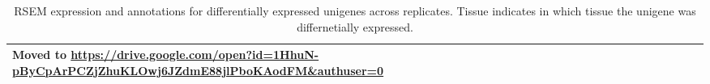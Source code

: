 \begin{table}[t]
\centering
\caption{RSEM expression and annotations for differentially expressed unigenes 
  across replicates. Tissue indicates in which tissue the unigene was differnetially expressed.}

\begin{tabular}{lll}
\toprule
    Moved to \scriptsize{\url{https://drive.google.com/open?id=1HhuN-pByCpArPCZjZhuKLOwj6JZdmE88jlPboKAodFM&authuser=0}} \\
\bottomrule
\end{tabular}
\label{tab:dge_bp}
\end{table}
